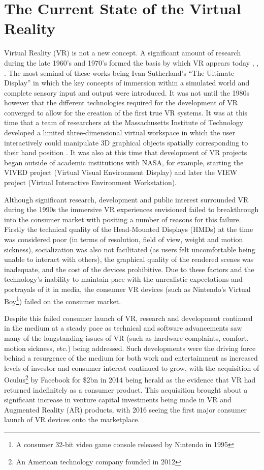 \documentclass{l4proj}
\begin{document}
\section{The Current State of the Virtual Reality}
\label{sec:introductionbackground}
Virtual Reality (VR) is not a new concept. A significant amount of research during the late 1960’s and 1970’s formed the basis by which VR appears today \cite{Sutherland65theultimate}, \cite{Sutherland_ahead-mounted}, \cite{ResponseEnviron}. The most seminal of these works being Ivan Sutherland's ``The Ultimate Display'' in which the key concepts of immersion within a simulated world and complete sensory input and output were introduced. It was not until the 1980s however that the different technologies required for the development of VR converged to allow for the creation of the first true VR systems. It was at this time that a team of researchers at the Massachusetts Institute of Technology developed a limited three-dimensional virtual workspace in which the user interactively could manipulate 3D graphical objects spatially corresponding to their hand position \cite{MIT}. It was also at this time that development of VR projects began outside of academic institutions with NASA, for example, starting the VIVED project (Virtual Visual Environment Display) and later the VIEW project (Virtual Interactive Environment Workstation).

Although significant research, development and public interest \cite{RandyDisney} surrounded VR during the 1990s the immersive VR experiences envisioned failed to breakthrough into the consumer market with \cite{mark} positing a number of reasons for this failure. Firstly the technical quality of the Head-Mounted Displays (HMDs) at the time was considered poor (in terms of resolution, field of view, weight and motion sickness), socialization was also not facilitated (as users felt uncomfortable being unable to interact with others), the graphical quality of the rendered scenes was inadequate, and the cost of the devices prohibitive. Due to these factors and the technology's inability to maintain pace with the unrealistic expectations and portrayals of it in media, the consumer VR devices (such as Nintendo's Virtual Boy\footnote{A consumer 32-bit video game console released by Nintendo in 1995}) failed on the consumer market. 

Despite this failed consumer launch of VR, research and development continued in the medium at a steady pace as technical and software advancements saw many of the longstanding issues of VR (such as hardware complaints, comfort, motion sickness, etc.) being addressed. Such developments were the driving force behind a resurgence of the medium for both work and entertainment \cite{mark} as increased levels of investor and consumer interest continued to grow, with the acquisition of Oculus\footnote{An American technology company founded in 2012} by Facebook for \$2bn in 2014 being herald as the evidence that VR had returned indefinitely as a consumer product. This acquisition brought about a significant increase in venture capital investments being made in VR and Augmented Reality (AR) products, with 2016 seeing the first major consumer launch of VR devices onto the marketplace. 
\end{document}
